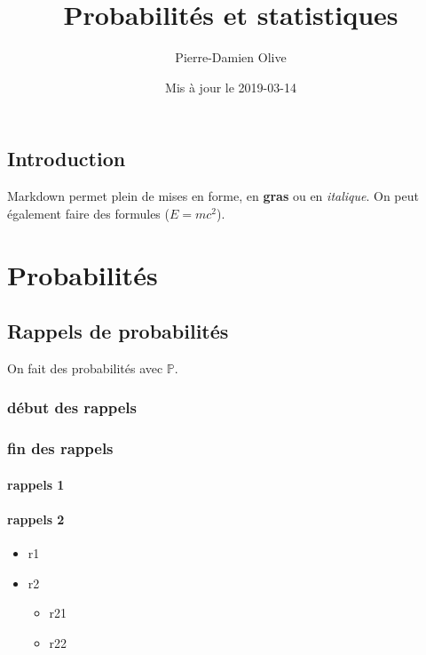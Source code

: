 \documentclass[]{book}
\title{Probabilités et statistiques}
\author{Pierre-Damien Olive}
\date{Mis à jour le 2019-03-14}
\providecommand{\tightlist}{%
  \setlength{\itemsep}{0pt}\setlength{\parskip}{0pt}}
\theoremstyle{definition}
\theoremstyle{definition}
\theoremstyle{definition}
\theoremstyle{remark}
\begin{document}
\maketitle

{
\setcounter{tocdepth}{1}
\tableofcontents
}
\chapter{Introduction}\label{introduction}

Markdown permet plein de mises en forme, en \textbf{gras} ou en
\emph{italique}. On peut également faire des formules (\(E = mc^2\)).

\part{Probabilités}\label{part-probabilites}

\chapter{Rappels de probabilités}\label{rappels-de-probabilites}

On fait des probabilités avec \(\mathbb{P}\).

\section{début des rappels}\label{debut-des-rappels}

\section{fin des rappels}\label{fin-des-rappels}

\subsection{rappels 1}\label{rappels-1}

\subsection{rappels 2}\label{rappels-2}

\begin{itemize}
\tightlist
\item
  r1
\item
  r2

  \begin{itemize}
  \tightlist
  \item
    r21
  \item
    r22
  \end{itemize}
\end{itemize}
\end{document}
